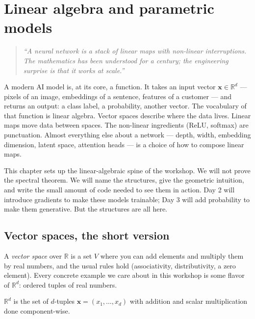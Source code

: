 \chapter{Linear algebra and parametric models}
\label{ch:day1}

\begin{quote}
\emph{``A neural network is a stack of linear maps with non-linear interruptions. The mathematics has been understood for a century; the engineering surprise is that it works at scale.''}
\end{quote}

A modern AI model is, at its core, a function. It takes an input vector $\bm{x} \in \mathbb{R}^d$ --- pixels of an image, embeddings of a sentence, features of a customer --- and returns an output: a class label, a probability, another vector. The vocabulary of that function is linear algebra. Vector spaces describe where the data lives. Linear maps move data between spaces. The non-linear ingredients (ReLU, softmax) are punctuation. Almost everything else about a network --- depth, width, embedding dimension, latent space, attention heads --- is a choice of how to compose linear maps.

This chapter sets up the linear-algebraic spine of the workshop. We will not prove the spectral theorem. We will name the structures, give the geometric intuition, and write the small amount of code needed to see them in action. Day 2 will introduce gradients to make these models trainable; Day 3 will add probability to make them generative. But the structures are all here.

\section{Vector spaces, the short version}

A \emph{vector space} over $\mathbb{R}$ is a set $V$ where you can add elements and multiply them by real numbers, and the usual rules hold (associativity, distributivity, a zero element). Every concrete example we care about in this workshop is some flavor of $\mathbb{R}^d$: ordered tuples of real numbers.

\begin{definition}
$\mathbb{R}^d$ is the set of $d$-tuples $\bm{x} = (x_1, \ldots, x_d)$ with addition and scalar multiplication done component-wise.
\end{definition}

